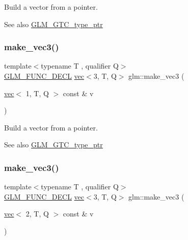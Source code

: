 Build a vector from a pointer. \begin{DoxySeeAlso}{See also}
\hyperlink{group__gtc__type__ptr}{G\+L\+M\+\_\+\+G\+T\+C\+\_\+type\+\_\+ptr} 
\end{DoxySeeAlso}
\mbox{\label{group__gtc__type__ptr_ga9147e4b3a5d0f4772edfbfd179d7ea0b}} 
\subsubsection{\texorpdfstring{make\+\_\+vec3()}{make\_vec3()}\hspace{0.1cm}{\footnotesize\ttfamily [1/5]}}
{\footnotesize\ttfamily template$<$typename T , qualifier Q$>$ \\
\hyperlink{setup_8hpp_ab2d052de21a70539923e9bcbf6e83a51}{G\+L\+M\+\_\+\+F\+U\+N\+C\+\_\+\+D\+E\+CL} \hyperlink{structglm_1_1vec}{vec}$<$3, T, Q$>$ glm\+::make\+\_\+vec3 (\begin{DoxyParamCaption}\item[{\hyperlink{structglm_1_1vec}{vec}$<$ 1, T, Q $>$ const \&}]{v }\end{DoxyParamCaption})\hspace{0.3cm}{\ttfamily [inline]}}

Build a vector from a pointer. \begin{DoxySeeAlso}{See also}
\hyperlink{group__gtc__type__ptr}{G\+L\+M\+\_\+\+G\+T\+C\+\_\+type\+\_\+ptr} 
\end{DoxySeeAlso}
\mbox{\label{group__gtc__type__ptr_ga482b60a842a5b154d3eed392417a9511}} 
\subsubsection{\texorpdfstring{make\+\_\+vec3()}{make\_vec3()}\hspace{0.1cm}{\footnotesize\ttfamily [2/5]}}
{\footnotesize\ttfamily template$<$typename T , qualifier Q$>$ \\
\hyperlink{setup_8hpp_ab2d052de21a70539923e9bcbf6e83a51}{G\+L\+M\+\_\+\+F\+U\+N\+C\+\_\+\+D\+E\+CL} \hyperlink{structglm_1_1vec}{vec}$<$3, T, Q$>$ glm\+::make\+\_\+vec3 (\begin{DoxyParamCaption}\item[{\hyperlink{structglm_1_1vec}{vec}$<$ 2, T, Q $>$ const \&}]{v }\end{DoxyParamCaption})\hspace{0.3cm}{\ttfamily [inline]}}

